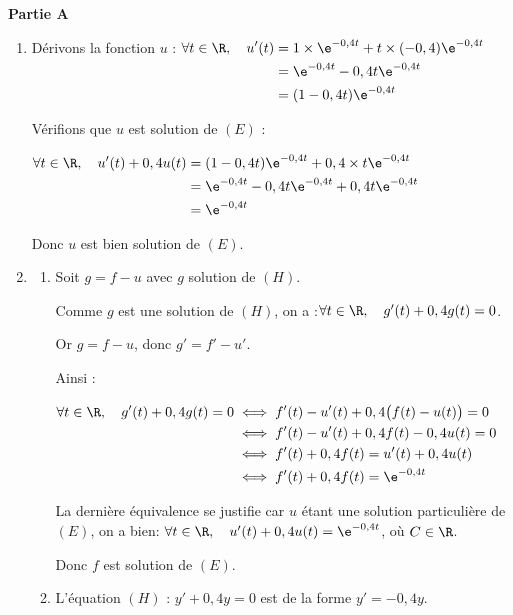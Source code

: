 \medskip

\textbf{Partie A}

	\medskip

\begin{enumerate}
\item Dérivons la fonction $u$ :
\quad
$\begin{aligned}[t]
\forall t \in \R,\quad u'(t) &= 1 \times \e^{-0,4t} + t \times (-0,4)\e^{-0,4t} \\
&= \e^{-0,4t} - 0,4t\e^{-0,4t} \\
&= (1 - 0,4t)\e^{-0,4t}
\end{aligned}$

Vérifions que $u$ est solution de $(E)$ :

$\begin{aligned}[t] \forall t \in \R, \quad
u'(t) + 0,4u(t) &= (1 - 0,4t)\e^{-0,4t} + 0,4 \times t\e^{-0,4t}\\
&= \e^{-0,4t} - 0,4t\e^{-0,4t} + 0,4t\e^{-0,4t}\\
&= \e^{-0,4t}
\end{aligned}$

Donc $u$ est bien solution de $(E)$.

\item
	\begin{enumerate}
		\item Soit $g = f - u$ avec $g$ solution de $(H)$.

Comme $g$ est une solution de $(H)$, on a :\quad $\forall t \in \R, \quad g'(t) + 0,4g(t) = 0$.

Or $g = f - u$, donc $g' = f' - u'$.

Ainsi :

$\begin{aligned}[t]
\forall t \in \R, \quad g'(t) +0,4g(t) = 0
	&\iff f'(t) - u'(t) + 0,4\big(f(t) - u(t)\big) = 0 \\
	&\iff f'(t) - u'(t) + 0,4f(t) - 0,4u(t) = 0\\
	&\iff f'(t) + 0,4f(t) = u'(t)  + 0,4u(t)\\
	&\iff f'(t) + 0,4f(t) = \e^{-0,4t}\\
\end{aligned}$

La dernière équivalence se justifie car $u$ étant une solution particulière de $(E)$, on a bien:
\quad $\forall t \in \R, \quad u'(t) + 0,4u(t) = \e^{-0,4t}$, \quad où $C \in \R$.

Donc $f$ est solution de $(E)$.

\item L'équation $(H)$ : $y' + 0,4y = 0$ est de la forme $y' = - 0,4y$.


\end{enumerate}
\end{enumerate}

